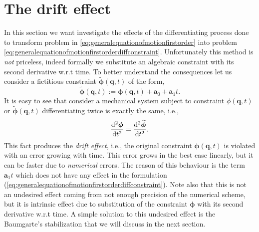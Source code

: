 	\section{The drift effect}
		In this section we want investigate the effects of the differentiating process done to transform problem in \cref{eq:generalequationofmotionfirstorder} into problem \cref{eq:generalequationofmotionfirstorderdiffconstraint}. Unfortunately this method is \emph{not} priceless, indeed formally we substitute an algebraic constraint with its second derivative w.r.t time. To better understand the consequences let us consider a fictitious constraint $\widetilde{\bm{\phi}}(\bm{q},t)$ of the form, 
		\begin{equation}
			\widetilde{\bm{\phi}}(\bm{q},t) := \bm{\phi}(\bm{q},t)+\bm{a}_0 + \bm{a}_{1}t.
		\end{equation}
		It is easy to see that consider a mechanical system subject to constraint $\phi(\bm{q},t)$ or $\widetilde{\bm{\phi}}(\bm{q},t)$ differentiating twice is exactly the same, i.e.,
		\begin{equation}
			\frac{\mathop{}\!\mathrm{d}^2\bm{\phi}}{\mathop{}\!\mathrm{d} t^2} = \frac{\mathop{}\!\mathrm{d}^2\widetilde{\bm{\phi}}}{\mathop{}\!\mathrm{d} t^2}.
		\end{equation}    
		This fact produces the \emph{drift effect}, i.e., the original constraint $\bm{\phi}(\bm{q},t)$ is violated with an error growing with time. This error grows in the best case linearly, but it can be faster due to \emph{numerical} errors. The reason of this behaviour is the term $\bm{a}_{1}t$ which does not have any effect in the formulation (\ref{eq:generalequationofmotionfirstorderdiffconstraint}). Note also that this is not an undesired effect coming from not enough precision of the numerical scheme, but it is intrinsic effect due to substitution of the constraint $\bm{\phi}$ with its second derivative w.r.t time. A simple solution to this undesired effect is the Baumgarte's stabilization that we will discuss in the next section.
